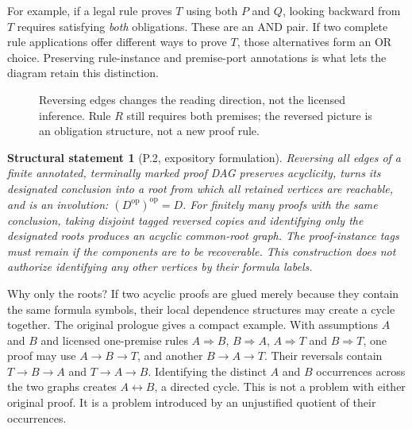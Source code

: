 \documentclass[11pt,letterpaper]{article}
\theoremstyle{plaincompact}
\newtheorem*{theorem}{Structural statement}
\begin{document}
For example, if a legal rule proves $T$ using both $P$ and $Q$, looking backward from $T$ requires satisfying \emph{both} obligations. These are an AND pair. If two complete rule applications offer different ways to prove $T$, those alternatives form an OR choice. Preserving rule-instance and premise-port annotations is what lets the diagram retain this distinction.

\begin{figure}[htbp]
\centering
{}
\caption{Reversing edges changes the reading direction, not the licensed inference. Rule $R$ still requires both premises; the reversed picture is an obligation structure, not a new proof rule.}
\end{figure}

\begin{theorem}[P.2, expository formulation]
Reversing all edges of a finite annotated, terminally marked proof DAG preserves acyclicity, turns its designated conclusion into a root from which all retained vertices are reachable, and is an involution: $(D^{\mathrm{op}})^{\mathrm{op}}=D$. For finitely many proofs with the same conclusion, taking disjoint tagged reversed copies and identifying \emph{only} the designated roots produces an acyclic common-root graph. The proof-instance tags must remain if the components are to be recoverable. This construction does not authorize identifying any other vertices by their formula labels.
\end{theorem}

Why only the roots? If two acyclic proofs are glued merely because they contain the same formula symbols, their local dependence structures may create a cycle together. The original prologue gives a compact example. With assumptions $A$ and $B$ and licensed one-premise rules $A\Rightarrow B$, $B\Rightarrow A$, $A\Rightarrow T$ and $B\Rightarrow T$, one proof may use $A\to B\to T$, and another $B\to A\to T$. Their reversals contain $T\to B\to A$ and $T\to A\to B$. Identifying the distinct $A$ and $B$ occurrences across the two graphs creates $A\leftrightarrow B$, a directed cycle. This is not a problem with either original proof. It is a problem introduced by an unjustified quotient of their occurrences.
\end{document}
